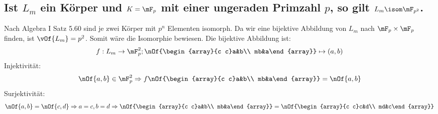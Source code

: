 \subsection{Ist $L_m$ ein Körper und $K=\mF_p$ mit einer ungeraden Primzahl $p$, so gilt $L_m \isom \mF_{p^2}$.} Nach Algebra I Satz 5.60 sind je zwei Körper mit $p^n$ Elementen isomorph. Da wir eine bijektive Abbildung von $L_m$ nach $\mF_p\times\mF_p$ finden, ist $\vOf{L_m} = p^2$. Somit wäre die Isomorphie bewiesen. Die bijektive Abbildung ist:
\begin{equation}
	f: L_m \to \mF_p^2; \nOf{\begin{array}{c c}a&b\\ mb&a\end{array}} \mapsto (a,b)
\end{equation}
Injektivität:
\begin{equation}
	\nOf{a,b} \in \mF_p^2 \Rightarrow f\nOf{\begin{array}{c c}a&b\\ mb&a\end{array}} = \nOf{a,b}
\end{equation}
Surjektivität:
\begin{equation}
	\nOf{a,b} = \nOf{c,d} \Rightarrow a=c,b=d \Rightarrow \nOf{\begin{array}{c c}a&b\\ mb&a\end{array}} = \nOf{\begin{array}{c c}c&d\\ md&c\end{array}}
\end{equation}
